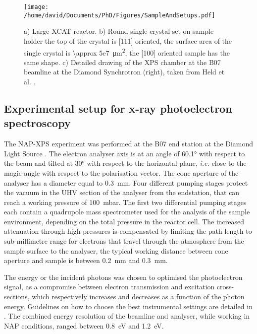 \begin{figure}[!htb]
    \centering
    \texttt{[image: /home/david/Documents/PhD/Figures/SampleAndSetups.pdf]}
    \caption{
        a) Large XCAT reactor.
        b) Round single crystal set on sample holder the top of the crystal is [111] oriented, the surface area of the single crystal is \qty{\approx 5e7}{\um^2}, the [100] oriented sample has the same shape.
        c) Detailed drawing of the XPS chamber at the B07 beamline at the Diamond Synchrotron (right), taken from Held et al. \parencite*{Held2020}.
    }
    \label{fig:SampleSXRD}
\end{figure}

\subsection{Experimental setup for x-ray photoelectron spectroscopy} \label{sec:XPS111}

The NAP-XPS experiment was performed at the B07 end station at the Diamond Light Source \parencite{Held2020}.
The electron analyser axis is at an angle of \ang{60.1} with respect to the beam and tilted at \ang{30} with respect to the horizontal plane, \textit{i.e.} close to the magic angle with respect to the polarisation vector.
The cone aperture of the analyser has a diameter equal to \qty{0.3}{\mm}.
Four different pumping stages protect the vacuum in the UHV section of the analyser from the endstation, that can reach a working pressure of \qty{100}{\milli\bar}.
The ﬁrst two differential pumping stages each contain a quadrupole mass spectrometer used for the analysis of the sample environment, depending on the total pressure in the reactor cell.
The increased attenuation through high pressures is compensated by limiting the path length to sub-millimetre range for electrons that travel through the atmosphere from the sample surface to the analyser, the typical working distance between cone aperture and sample is between \qty{0.2}{\mm} and \qty{0.3}{\mm}.

The energy or the incident photons was chosen to optimised the photoelectron signal, as a compromise between electron transmission and excitation cross-sections, which respectively increases and decreases as a function of the photon energy.
Guidelines on how to choose the best instrumental settings are detailed in \parencite{Held2020}.
The combined energy resolution of the beamline and analyser, while working in NAP conditions, ranged between \qty{0.8}{\eV} and \qty{1.2}{\eV}.